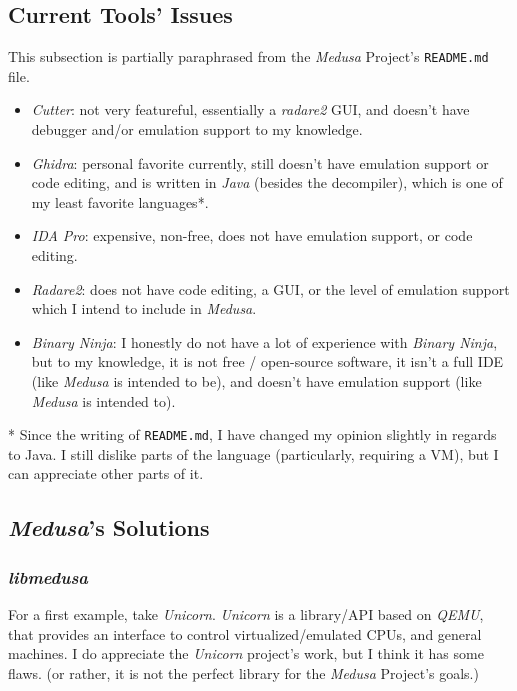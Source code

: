 \documentclass{article}
\begin{document}
	\subsection{Current Tools' Issues}
	This subsection is partially paraphrased from the \textit{Medusa} Project's
	\texttt{README.md} file.

	\begin{itemize}
		\item \textit{Cutter}: not very featureful, essentially a
		\textit{radare2} GUI, and doesn't have debugger and/or emulation support
		to my knowledge.
		\item \textit{Ghidra}: personal favorite currently, still doesn't have
		emulation support or code editing, and is written in \textit{Java}
		(besides the decompiler), which is one of my least favorite languages*.
		\item \textit{IDA Pro}: expensive, non-free, does not have emulation
		support, or code editing.
		\item \textit{Radare2}: does not have code editing, a GUI, or the level
		of emulation support which I intend to include in \textit{Medusa}.
		\item \textit{Binary Ninja}: I honestly do not have a lot of experience
		with \textit{Binary Ninja}, but to my knowledge, it is not free / 
		open-source software, it isn't a full IDE (like \textit{Medusa} is
		intended to be), and doesn't have emulation support (like
		\textit{Medusa} is intended to).
	\end{itemize}

	* Since the writing of \texttt{README.md}, I have changed my opinion
	slightly in regards to Java. I still dislike parts of the language
	(particularly, requiring a VM), but I can appreciate other parts of it.

	\subsection{\textit{Medusa}'s Solutions}
	\subsubsection{\textit{libmedusa}} \label{solution_libmedusa1}
	For a first example, take \textit{Unicorn}. \textit{Unicorn} is a
	library/API based on \textit{QEMU}, that provides an interface to control
	virtualized/emulated CPUs, and general machines. I do appreciate the
	\textit{Unicorn} project's work, but I think it has some flaws. (or rather,
	it is not the perfect library for the \textit{Medusa} Project's goals.)
\end{document}
